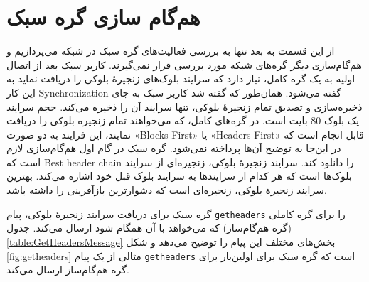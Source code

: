 \section{هم‌گام سازی گره سبک}
از این قسمت به بعد تنها به بررسی فعالیت‌های گره سبک در شبکه می‌پردازیم و هم‌گام‌سازی دیگر گره‌های شبکه مورد بررسی قرار نمی‌گیرند. کاربر سبک بعد از اتصال اولیه به یک گره کامل، نیاز دارد که سرایند بلوک‌های زنجیرهٔ بلوکی را دریافت نماید به این کار 
\gls{Synchronization}
گفته می‌شود. همان‌طور که گفته شد کاربر سبک به جای ذخیره‌سازی و تصدیق تمام زنجیرهٔ بلوکی،‌ تنها سرایند آن را ذخیره می‌کند. حجم سرایند یک بلوک $80$ بایت است. در گره‌های کامل، که می‌خواهند تمام زنجیره بلوکی را دریافت نمایند، این فرایند به دو صورت
«\gls{Blocks-First}»
یا
«\gls{Headers-First}»
قابل انجام است که در این‌جا به توضیح آن‌ها پرداخته نمی‌شود. گره سبک در گام اول هم‌گام‌سازی لازم است که 
\gls{Best header chain}
را دانلود کند. سرایند زنجیرهٔ بلوکی، زنجیره‌ای از سرایند بلوک‌ها است که هر کدام از سرایند‌ها به سرایند بلوک قبل خود اشاره می‌کند. بهترین سرایند زنجیرهٔ بلوکی، زنجیره‌ای است که دشوارترین بازآفرینی را داشته باشد. 

گره سبک برای دریافت سرایند زنجیرهٔ بلوکی، پیام \texttt{getheaders} را برای گره کاملی (گره هم‌گام‌ساز) که می‌خواهد با آن همگام شود ارسال می‌کند. جدول \ref{table:GetHeadersMessage} بخش‌های مختلف این پیام را توضیح می‌دهد و شکل \ref{fig:getheaders} مثالی از یک پیام \texttt{getheaders} است که گره سبک برای اولین‌بار برای گره هم‌گام‌ساز ارسال می‌کند.



